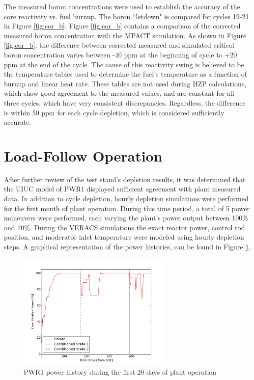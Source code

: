 \documentclass[edeposit,fullpage,11pt]{uiucthesis2009}
\begin{document}
The measured boron concentrations were used to establish the accuracy of the core reactivity vs. fuel burnup. 
The boron ``letdown" is compared for cycles 19-21 in Figure \ref{fig:cor_b}. 
Figure \ref{fig:cor_b} contains a comparison of the corrected measured boron concentration with the MPACT simulation. 
As shown in Figure \ref{fig:cor_b}, the difference between corrected measured and simulated critical boron concentration varies between -40 ppm at the beginning of cycle to +20 ppm at the end of the cycle. 
The cause of this reactivity swing is believed to be the temperature tables used to determine the fuel's temperature as a function of burnup and linear heat rate.
These tables are not used during \gls{HZP} calculations, which show good agreement to the measured values, and are constant for all three cycles, which have very consistent discrepancies.
Regardless, the difference is within 50 ppm for each cycle depletion, which is considered sufficiently accurate.

\section{Load-Follow Operation}

After further review of the test stand's depletion results, it was determined that the \gls{UIUC} model of PWR1 displayed sufficient agreement with plant measured data. 
In addition to cycle depletion, hourly depletion simulations were performed for the first month of plant operation.
During this time period, a total of 5 power maneuvers were performed, each varying the plant's power output between 100\% and 70\%.
During the \gls{VERACS} simulations the exact reactor power, control rod position, and moderator inlet temperature were modeled using hourly depletion steps.
A graphical representation of the power histories, can be found in Figure \ref{fig:lf_his0}.

\begin{figure}[h]
\begin{center}
\includegraphics[width=3in]{./Figures/M_power_his.pdf} 
\end{center}
\caption{PWR1 power history during the first 20 days of plant operation}
\label{fig:lf_his0}
\end{figure}
\end{document}
